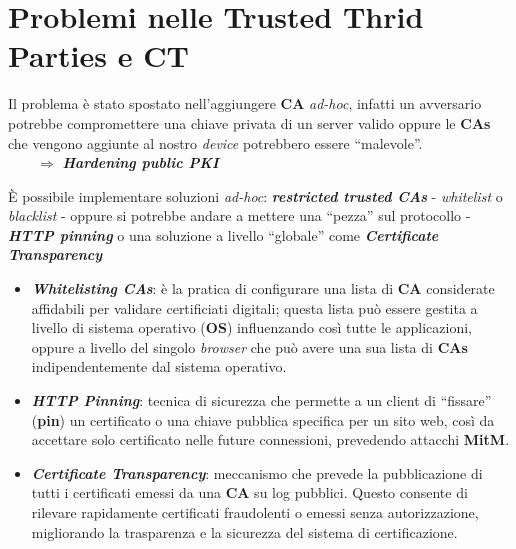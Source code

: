 \newpage

\section{Problemi nelle Trusted Thrid Parties e CT}

\begin{flushleft}
    
    Il problema è stato spostato nell'aggiungere \textbf{CA} \textit{ad-hoc}, infatti un avversario potrebbe compromettere una chiave privata di un server valido oppure le \textbf{CAs} che vengono aggiunte al nostro \textit{device} potrebbero essere ``malevole''. \\
    $ \qquad \Rightarrow$ \textbf{\textit{Hardening public PKI}}

    \smallskip

    È possibile implementare soluzioni \textit{ad-hoc}: \textbf{\textit{restricted trusted CAs}} - \textit{whitelist} o \textit{blacklist} - oppure si potrebbe andare a mettere una ``pezza'' sul protocollo - \textbf{\textit{HTTP pinning}} o una soluzione a livello ``globale'' come \textbf{\textit{Certificate Transparency}}
    \begin{itemize}[nosep]
        \item \textbf{\textit{Whitelisting CAs}}: è la pratica di configurare una lista di \textbf{CA} considerate affidabili per validare certificiati digitali; questa lista può essere gestita a livello di sistema operativo (\textbf{OS}) influenzando così tutte le applicazioni, oppure a livello del singolo \textit{browser} che può avere una sua lista di \textbf{CAs} indipendentemente dal sistema operativo.
        \item \textbf{\textit{HTTP Pinning}}: tecnica di sicurezza che permette a un client di ``fissare'' (\textbf{pin}) un certificato o una chiave pubblica specifica per un sito web, così da accettare solo certificato nelle future connessioni, prevedendo attacchi \textbf{MitM}.
        \item \textbf{\textit{Certificate Transparency}}: meccanismo che prevede la pubblicazione di tutti i certificati emessi da una \textbf{CA} su log pubblici. Questo consente di rilevare rapidamente certificati fraudolenti o emessi senza autorizzazione, migliorando la trasparenza e la sicurezza del sistema di certificazione.
    \end{itemize}


\end{flushleft}
